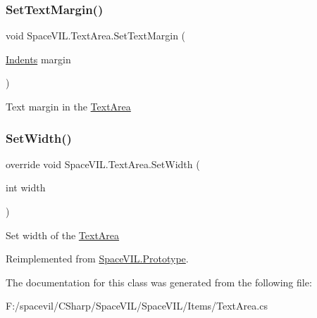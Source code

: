 \subsubsection{\texorpdfstring{Set\+Text\+Margin()}{SetTextMargin()}}
{\footnotesize\ttfamily void Space\+V\+I\+L.\+Text\+Area.\+Set\+Text\+Margin (\begin{DoxyParamCaption}\item[{\mbox{\hyperlink{struct_space_v_i_l_1_1_decorations_1_1_indents}{Indents}}}]{margin }\end{DoxyParamCaption})}



Text margin in the \mbox{\hyperlink{class_space_v_i_l_1_1_text_area}{Text\+Area}} 

\mbox{\label{class_space_v_i_l_1_1_text_area_a214e3d5afc4c12519fb8594dce699ef0}} 
\subsubsection{\texorpdfstring{Set\+Width()}{SetWidth()}}
{\footnotesize\ttfamily override void Space\+V\+I\+L.\+Text\+Area.\+Set\+Width (\begin{DoxyParamCaption}\item[{int}]{width }\end{DoxyParamCaption})\hspace{0.3cm}{\ttfamily [virtual]}}



Set width of the \mbox{\hyperlink{class_space_v_i_l_1_1_text_area}{Text\+Area}} 



Reimplemented from \mbox{\hyperlink{class_space_v_i_l_1_1_prototype_a6a4f1b9581f4d18f1c3a3e287d4b2a2b}{Space\+V\+I\+L.\+Prototype}}.



The documentation for this class was generated from the following file\+:\begin{DoxyCompactItemize}
\item 
F\+:/spacevil/\+C\+Sharp/\+Space\+V\+I\+L/\+Space\+V\+I\+L/\+Items/Text\+Area.\+cs\end{DoxyCompactItemize}
